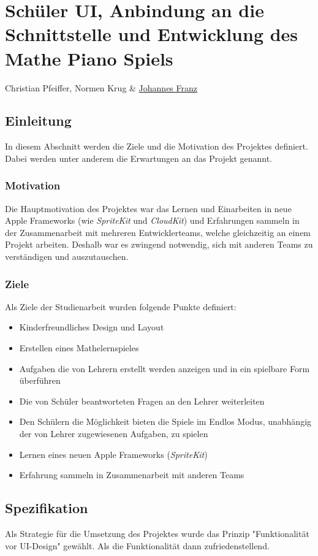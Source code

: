 \chapter{Schüler UI, Anbindung an die Schnittstelle und Entwicklung des Mathe Piano Spiels}
Christian Pfeiffer, Normen Krug \& \href{mailto:jofranz90@gmail.com?subject=Swift-Studienarbeit}{Johannes Franz}


\section{Einleitung}
In diesem Abschnitt werden die Ziele und die Motivation des Projektes definiert. Dabei werden unter anderem die Erwartungen an das Projekt genannt.

\subsection{Motivation}
Die Hauptmotivation des Projektes war das Lernen und Einarbeiten in neue Apple Frameworks (wie \textit{SpriteKit} und \textit{CloudKit}) und Erfahrungen sammeln in der Zusammenarbeit mit mehreren Entwicklerteams, welche gleichzeitig an einem Projekt arbeiten. Deshalb war es zwingend notwendig, sich mit anderen Teams zu verständigen und auszutauschen.  

\subsection{Ziele}
Als Ziele der Studienarbeit wurden folgende Punkte definiert: 
\begin{itemize}
\item Kinderfreundliches Design und Layout
\item Erstellen eines Mathelernspieles 
\item Aufgaben die von Lehrern erstellt werden anzeigen und in ein spielbare Form überführen
\item Die von Schüler beantworteten Fragen an den Lehrer weiterleiten
\item Den Schülern die Möglichkeit bieten die Spiele im Endlos Modus, unabhängig der von Lehrer zugewiesenen Aufgaben, zu spielen
\item Lernen eines neuen Apple Frameworks (\textit{SpriteKit})
\item Erfahrung sammeln in Zusammenarbeit mit anderen Teams
\end{itemize}
\section{Spezifikation}
Als Strategie für die Umsetzung des Projektes wurde das Prinzip "Funktionalität vor UI-Design" gewählt. Als die Funktionalität dann zufriedenstellend.

